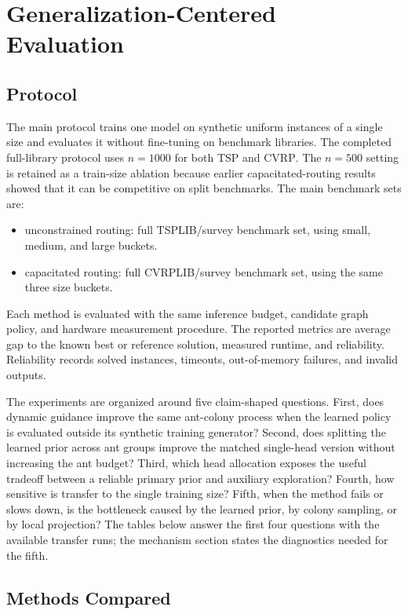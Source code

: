 \documentclass[11pt]{article}
\newcommand{\TSP}{\textsc{TSP}}
\newcommand{\CVRP}{\textsc{CVRP}}
\begin{document}
\section{Generalization-Centered Evaluation}
\label{sec:evaluation}

\subsection{Protocol}
\label{sec:protocol}

The main protocol trains one model on synthetic uniform instances of a single size and evaluates it without fine-tuning on benchmark libraries.
The completed full-library protocol uses $n=1000$ for both \TSP{} and \CVRP{}.
The $n=500$ setting is retained as a train-size ablation because earlier capacitated-routing results showed that it can be competitive on split benchmarks.
The main benchmark sets are:
\begin{itemize}
    \item unconstrained routing: full TSPLIB/survey benchmark set, using small, medium, and large buckets.
    \item capacitated routing: full CVRPLIB/survey benchmark set, using the same three size buckets.
\end{itemize}
Each method is evaluated with the same inference budget, candidate graph policy, and hardware measurement procedure.
The reported metrics are average gap to the known best or reference solution, measured runtime, and reliability.
Reliability records solved instances, timeouts, out-of-memory failures, and invalid outputs.

The experiments are organized around five claim-shaped questions.
First, does dynamic guidance improve the same ant-colony process when the learned policy is evaluated outside its synthetic training generator?
Second, does splitting the learned prior across ant groups improve the matched single-head version without increasing the ant budget?
Third, which head allocation exposes the useful tradeoff between a reliable primary prior and auxiliary exploration?
Fourth, how sensitive is transfer to the single training size?
Fifth, when the method fails or slows down, is the bottleneck caused by the learned prior, by colony sampling, or by local projection?
The tables below answer the first four questions with the available transfer runs; the mechanism section states the diagnostics needed for the fifth.

\subsection{Methods Compared}
\label{sec:compared}
\end{document}

